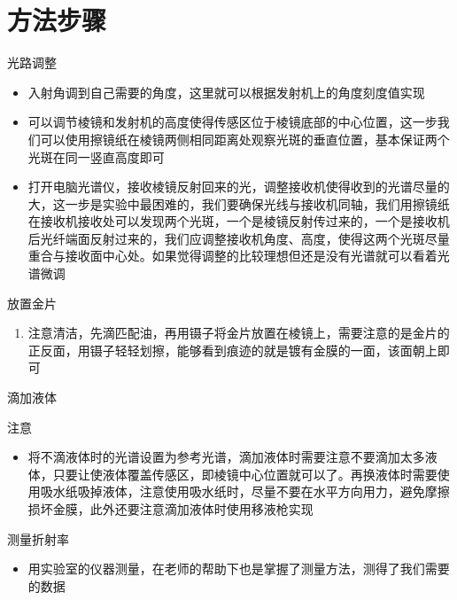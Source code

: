 \documentclass{beamer}
\begin{document}
\section{方法步骤}
\begin{frame}{光路调整}
  \begin{itemize}
    \item 入射角调到自己需要的角度，这里就可以根据发射机上的角度刻度值实现
    \item 可以调节棱镜和发射机的高度使得传感区位于棱镜底部的中心位置，这一步我们可以使用擦镜纸在棱镜两侧相同距离处观察光斑的垂直位置，基本保证两个光斑在同一竖直高度即可
    \item 打开电脑光谱仪，接收棱镜反射回来的光，调整接收机使得收到的光谱尽量的大，这一步是实验中最困难的，我们要确保光线与接收机同轴，我们用擦镜纸在接收机接收处可以发现两个光斑，一个是棱镜反射传过来的，一个是接收机后光纤端面反射过来的，我们应调整接收机角度、高度，使得这两个光斑尽量重合与接收面中心处。如果觉得调整的比较理想但还是没有光谱就可以看着光谱微调
  \end{itemize}
\end{frame}
\begin{frame}{放置金片}
  \begin{enumerate}
    \item 注意清洁，先滴匹配油，再用镊子将金片放置在棱镜上，需要注意的是金片的正反面，用镊子轻轻划擦，能够看到痕迹的就是镀有金膜的一面，该面朝上即可
  \end{enumerate}
\end{frame}
\begin{frame}{滴加液体}
\begin{block}{注意}
  \begin{itemize}
    \item 将不滴液体时的光谱设置为参考光谱，滴加液体时需要注意不要滴加太多液体，只要让使液体覆盖传感区，即棱镜中心位置就可以了。再换液体时需要使用吸水纸吸掉液体，注意使用吸水纸时，尽量不要在水平方向用力，避免摩擦损坏金膜，此外还要注意滴加液体时使用移液枪实现
  \end{itemize}
\end{block}
\end{frame}
\begin{frame}{测量折射率}
    \begin{itemize}
      \item 用实验室的仪器测量，在老师的帮助下也是掌握了测量方法，测得了我们需要的数据
    \end{itemize}
  \end{frame}
\end{document}
